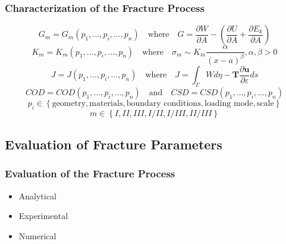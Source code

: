 \documentclass[first,firstsupp,lastsupp,handout,last,hyperref,table]{ETHclass}
\begin{document}
\begin{frame}
\frametitle{Characterization of the Fracture Process}
\vspace{-0.7cm}
\centering
\footnotesize
\begin{equation*}
G_{m}=G_{m}\left(p_{1},\dots,p_{i},\dots,p_{n}\right)\quad\text{where}\quad G=\frac{\partial W}{\partial A} - \left(\frac{\partial U}{\partial A}+\frac{\partial E_{k}}{\partial A}\right)
\end{equation*}
\begin{equation*}
K_{m}=K_{m}\left(p_{1},\dots,p_{i},\dots,p_{n}\right)\quad\text{where}\quad \sigma_{m}\sim K_{m}\frac{\alpha}{\left(x-a\right)^{\beta}}, \alpha,\beta>0
\end{equation*}
\begin{equation*}
J=J\left(p_{1},\dots,p_{i},\dots,p_{n}\right)\quad\text{where}\quad J=\int_{\Gamma}Wd\eta-\mathbf{T}\frac{\partial\mathbf{u}}{\partial\varepsilon}ds
\end{equation*}
\begin{equation*}
COD=COD\left(p_{1},\dots,p_{i},\dots,p_{n}\right)\quad\text{and}\quad CSD=CSD\left(p_{1},\dots,p_{i},\dots,p_{n}\right)
\end{equation*}
\vspace{10pt}
\begin{equation*}
p_{i}\in\left\{\text{geometry},\text{materials},\text{boundary conditions},\text{loading mode},\text{scale}\right\}
\end{equation*}
\begin{equation*}
m\in\left\{I,II,III,I/II,I/III,II/III\right\}
\end{equation*}
\end{frame}

\subsection[Evaluation]{Evaluation of Fracture Parameters}

\begin{frame}
\frametitle{Evaluation of the Fracture Process}
\vspace{-0.7cm}
\centering
\begin{itemize}[label=]
\item Analytical
\item Experimental
\item Numerical
\end{itemize}
\end{frame}
\end{document}
